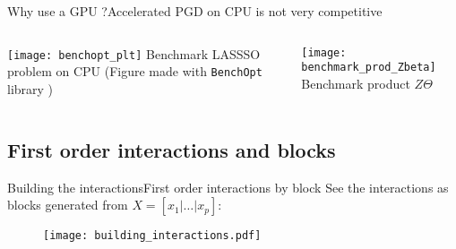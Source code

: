 \documentclass[10pt,aspectratio=43]{beamer}
\begin{document}
\begin{frame}[fragile]{Why use a GPU ?}{Accelerated PGD on CPU is not very competitive}
    \begin{columns}
        \begin{column}{0.55\textwidth}
            \centering
            \texttt{[image: benchopt\_plt]}
           \hfill Benchmark LASSSO problem on CPU (Figure made with
            \texttt{BenchOpt} library \footnotemark)
        \end{column}
        \begin{column}{0.55\textwidth}
            \centering
            \texttt{[image: benchmark\_prod\_Zbeta]}
            \hfill Benchmark product $Z\Theta$
        \end{column}
    \end{columns}
    \medskip
{}
\end{frame}


\subsection{First order interactions and blocks}
\begin{frame}{Building the interactions}{First order interactions by block}
See the interactions as blocks generated from $X=[x_1|\dots|x_p]$:
\begin{figure}[h]
    \centering
    \texttt{[image: building\_interactions.pdf]}
\end{figure}
\end{frame}
\end{document}
